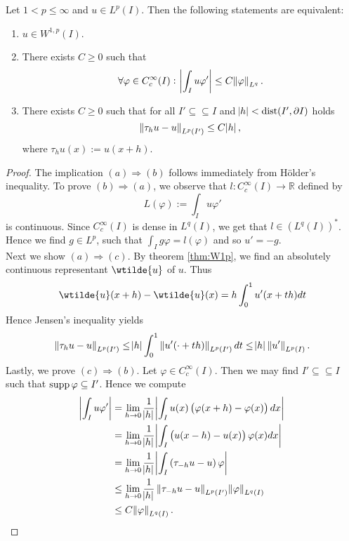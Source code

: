\begin{theorem}[Characterization of $W^{1,p}(I)$]
	Let $1 < p \leq \infty$ and $u \in L^p(I)$. Then the following statements are equivalent:
	\begin{enumerate}[label = \textup{(}\alph*\textup{)},wide = 0pt]
		\item $u \in W^{1,p}(I)$.
		\item There exists $C \geq 0$ such that
			\begin{equation*}
				\forall \varphi \in C^\infty_c(I): \> \abs[3]{\int_I u\varphi'} \leq C\norm{\varphi}_{L^q}.
			\end{equation*}
		\item There exists $C \geq 0$ such that for all $I' \subseteq \subseteq I$ and $\abs{h} < \operatorname{dist}(I',\partial I)$ holds
			\begin{equation*}
				\norm{\tau_hu - u}_{L^p(I')} \leq C\abs{h},
			\end{equation*}
			\noindent where $\tau_hu(x) := u(x + h)$.
	\end{enumerate}
\end{theorem}

\begin{proof}
	The implication $(a)\Rightarrow(b)$ follows immediately from H\"older's inequality. To prove $(b)\Rightarrow(a)$, we observe that $l : C^\infty_c(I) \to \mathbb{R}$ defined by
	\begin{equation*}
		L(\varphi) := \int_I u \varphi'
	\end{equation*}
	\noindent is continuous. Since $C^\infty_c(I)$ is dense in $L^q(I)$, we get that $l \in (L^q(I))^*$. Hence we find $g \in L^p$, such that $\int_I g\varphi = l(\varphi)$ and so $u' = -g$.\\
	Next we show $(a)\Rightarrow(c)$. By theorem \ref{thm:W1p}, we find an absolutely continuous representant $\wtilde{u}$ of $u$. Thus
	\begin{equation*}
		\wtilde{u}(x + h) - \wtilde{u}(x) = h\int_0^1 u'(x + th) dt
	\end{equation*}
	Hence Jensen's inequality yields
	\begin{equation*}
		\norm[0]{\tau_hu - u}_{L^p(I')} \leq \abs{h} \int_0^1 \norm[0]{u'(\cdot + th)}_{L^p(I')}dt \leq \abs{h} \norm[0]{u'}_{L^p(I)}.
	\end{equation*}
	Lastly, we prove $(c)\Rightarrow(b)$. Let $\varphi \in C^\infty_c(I)$. Then we may find $I' \subseteq \subseteq I$ such that $\operatorname{supp} \varphi\subseteq I'$. Hence we compute
	\begin{align*}
		\abs[3]{\int_I u\varphi'} &= \lim_{h \to 0}\frac{1}{\abs{h}} \abs[3]{\int_I u(x) \del[1]{\varphi(x + h) - \varphi(x)} dx}\\
		&= \lim_{h \to 0}\frac{1}{\abs{h}} \abs[3]{\int_I \del[1]{u(x - h) - u(x)} \varphi(x)dx}\\
		&= \lim_{h \to 0}\frac{1}{\abs{h}} \abs[3]{\int_I \del[0]{\tau_{-h}u - u}\varphi}\\
		&\leq \lim_{h \to 0}\frac{1}{\abs{h}}\norm[0]{\tau_{-h}u - u}_{L^p(I')}\norm{\varphi}_{L^q(I)}\\
		&\leq C\norm{\varphi}_{L^q(I)}.
	\end{align*}
\end{proof}

